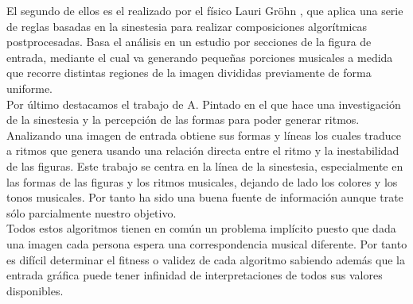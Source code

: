 El segundo de ellos es el realizado por el físico Lauri Gröhn \cite{rusofotos}, que aplica una serie de reglas basadas en la sinestesia para realizar composiciones algorítmicas postprocesadas. Basa el análisis en un estudio por secciones de la figura de entrada, mediante el cual va generando pequeñas porciones musicales a medida que recorre distintas regiones de la imagen divididas previamente de forma uniforme.\\

Por último destacamos el trabajo de A. Pintado \cite{portutesis} en el que hace una investigación de la sinestesia y la percepción de las formas para poder generar ritmos. Analizando una imagen de entrada obtiene sus formas y líneas los cuales traduce a ritmos que genera usando  una relación directa entre el ritmo y la inestabilidad de las figuras. Este trabajo se centra en la línea de la sinestesia, especialmente en las formas de las figuras y los ritmos musicales, dejando de lado los colores y los tonos musicales. Por tanto ha sido una buena fuente de información aunque trate sólo parcialmente nuestro objetivo.\\ 

Todos estos algoritmos tienen en común un problema implícito puesto que dada una imagen cada persona espera una correspondencia musical diferente. Por tanto es difícil determinar el fitness o validez de cada algoritmo sabiendo además que la entrada gráfica puede tener infinidad de interpretaciones de todos sus valores disponibles.

